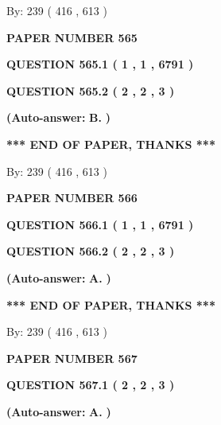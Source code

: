 \documentclass[12pt]{article}
\begin{document}
   
\hspace{1.0in} By: 
 239 ( 416 ,  613 )
   
   
   
   
\newpage 
\setcounter{page}{ 
   565001 } 
   
   
 {\textbf{ \Large{ PAPER NUMBER  565  }}}
   
   
   
   
  
  
{\textbf{\large{QUESTION
565.1 
 ( 1 , 1 , 6791 )
}}}
  
  
{\textbf{\large{QUESTION
565.2 
 ( 2 , 2 , 3 )
}}}
 
 
{\textbf{(Auto-answer:}}
{\textbf{\large{
B.}}}
{\textbf{)}}
 
 
   
   
   
   
\vspace{1.0in} 
{\textbf{\large{ *** END OF PAPER, THANKS *** }}} 
   
   
\hspace{1.0in} By: 
 239 ( 416 ,  613 )
   
   
   
   
\newpage 
\setcounter{page}{ 
   566001 } 
   
   
 {\textbf{ \Large{ PAPER NUMBER  566  }}}
   
   
   
   
  
  
{\textbf{\large{QUESTION
566.1 
 ( 1 , 1 , 6791 )
}}}
  
  
{\textbf{\large{QUESTION
566.2 
 ( 2 , 2 , 3 )
}}}
 
 
{\textbf{(Auto-answer:}}
{\textbf{\large{
A.}}}
{\textbf{)}}
 
 
   
   
   
   
\vspace{1.0in} 
{\textbf{\large{ *** END OF PAPER, THANKS *** }}} 
   
   
\hspace{1.0in} By: 
 239 ( 416 ,  613 )
   
   
   
   
\newpage 
\setcounter{page}{ 
   567001 } 
   
   
 {\textbf{ \Large{ PAPER NUMBER  567  }}}
   
   
   
   
  
  
{\textbf{\large{QUESTION
567.1 
 ( 2 , 2 , 3 )
}}}
 
 
{\textbf{(Auto-answer:}}
{\textbf{\large{
A.}}}
{\textbf{)}}
 
\end{document}
